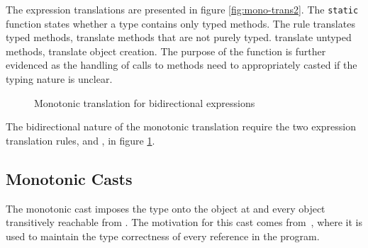 \documentclass[a4paper,USenglish]{tex/lipics-v2016}
\begin{document}
The expression translations are presented in figure \ref{fig:mono-trans2}. 
The \texttt{static} function states whether a type contains only typed methods.
The rule  translates typed methods,  translate methods that are not purely typed.
 translate untyped methods,  translate object creation.
The purpose of the  function is further evidenced as the 
handling of calls to methods need to appropriately casted if the typing nature is unclear.

\begin{figure}[!ht]
\begin{mathpar}

\end{mathpar}

\caption{Monotonic translation for bidirectional expressions}
\label{fig:mono-trans3}
\end{figure}

The bidirectional nature of the monotonic translation require the two 
expression translation rules,  and , 
in figure \ref{fig:mono-trans3}.

\subsection{Monotonic Casts}

The monotonic cast \MonCast\C\a imposes the type \C onto the object
at \a and every object transitively reachable from \a. The motivation 
for this cast comes from~\cite{Siek2015}, where it is used to maintain the
type correctness of every reference in the program.
\end{document}
